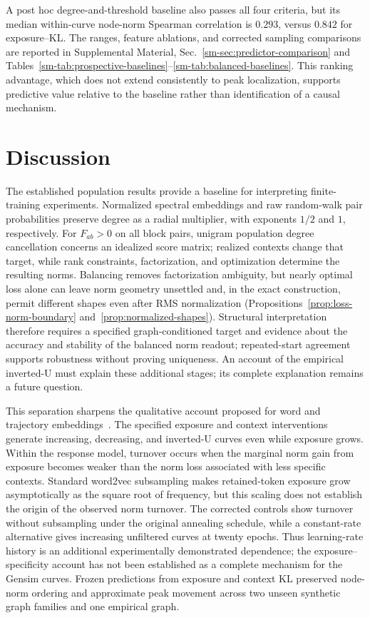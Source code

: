 \documentclass[aps,pre,reprint,superscriptaddress,longbibliography]{revtex4-2}
\begin{document}
A post hoc degree-and-threshold baseline also passes all four criteria, but its median within-curve node-norm Spearman correlation is \(0.293\), versus \(0.842\) for exposure--KL.
The ranges, feature ablations, and corrected sampling comparisons are reported in Supplemental Material, Sec.~\ref{sm-sec:predictor-comparison} and Tables~\ref{sm-tab:prospective-baselines}--\ref{sm-tab:balanced-baselines}.
This ranking advantage, which does not extend consistently to peak localization, supports predictive value relative to the baseline rather than identification of a causal mechanism.

\section{Discussion}

The established population results provide a baseline for interpreting finite-training experiments.
Normalized spectral embeddings and raw random-walk pair probabilities preserve degree as a radial multiplier, with exponents \(1/2\) and \(1\), respectively.
For \(F_{ab}>0\) on all block pairs, unigram population degree cancellation concerns an idealized score matrix; realized contexts change that target, while rank constraints, factorization, and optimization determine the resulting norms.
Balancing removes factorization ambiguity, but nearly optimal loss alone can leave norm geometry unsettled and, in the exact construction, permit different shapes even after RMS normalization (Propositions~\ref{prop:loss-norm-boundary} and~\ref{prop:normalized-shapes}).
Structural interpretation therefore requires a specified graph-conditioned target and evidence about the accuracy and stability of the balanced norm readout; repeated-start agreement supports robustness without proving uniqueness.
An account of the empirical inverted-U must explain these additional stages; its complete explanation remains a future question.

This separation sharpens the qualitative account proposed for word and trajectory embeddings~\citep{schakel2015measuring,wilson2015controlled,murray2023unsupervised}.
The specified exposure and context interventions generate increasing, decreasing, and inverted-U curves even while exposure grows.
Within the response model, turnover occurs when the marginal norm gain from exposure becomes weaker than the norm loss associated with less specific contexts.
Standard word2vec subsampling makes retained-token exposure grow asymptotically as the square root of frequency, but this scaling does not establish the origin of the observed norm turnover.
The corrected controls show turnover without subsampling under the original annealing schedule, while a constant-rate alternative gives increasing unfiltered curves at twenty epochs.
Thus learning-rate history is an additional experimentally demonstrated dependence; the exposure--specificity account has not been established as a complete mechanism for the Gensim curves.
Frozen predictions from exposure and context KL preserved node-norm ordering and approximate peak movement across two unseen synthetic graph families and one empirical graph.
\end{document}
